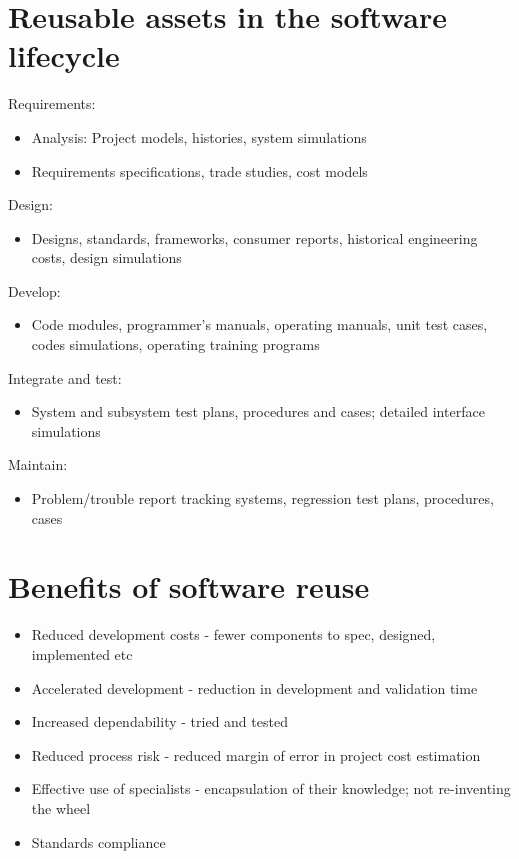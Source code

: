 \documentclass{article}[18pt]
\begin{document}
\section{Reusable assets in the software lifecycle}
Requirements:
\begin{itemize}
	\item Analysis: Project models, histories, system simulations
	\item Requirements specifications, trade studies, cost models
\end{itemize}
Design:
\begin{itemize}
	\item Designs, standards, frameworks, consumer reports, historical engineering costs, design simulations
\end{itemize}
Develop:
\begin{itemize}
	\item Code modules, programmer's manuals, operating manuals, unit test cases, codes simulations, operating training programs
\end{itemize}
Integrate and test:
\begin{itemize}
	\item System and subsystem test plans, procedures and cases; detailed interface simulations
\end{itemize}
Maintain:
\begin{itemize}
	\item Problem/trouble report tracking systems, regression test plans, procedures, cases
\end{itemize}
\section{Benefits of software reuse}
\begin{itemize}
	\item Reduced development costs - fewer components to spec, designed, implemented etc
	\item Accelerated development - reduction in development and validation time
	\item Increased dependability - tried and tested
	\item Reduced process risk - reduced margin of error in project cost estimation
	\item Effective use of specialists - encapsulation of their knowledge; not re-inventing the wheel
	\item Standards compliance
\end{itemize}
\end{document}
